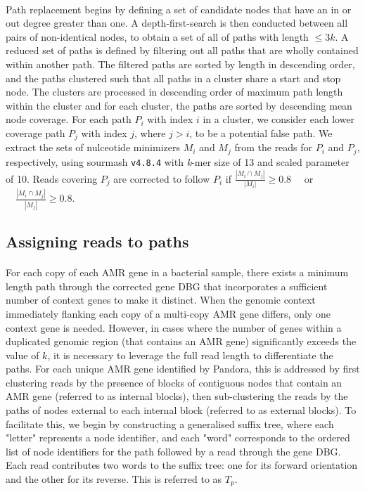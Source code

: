 \paragraph{}
Path replacement begins by defining a set of candidate nodes that have an in or out degree greater than one. A depth-first-search is then conducted between all pairs of non-identical nodes, to obtain a set of all of paths with length $\leq 3k$. A reduced set of paths is defined by filtering out all paths that are wholly contained within another path. The filtered paths are sorted by length in descending order, and the paths clustered such that all paths in a cluster share a start and stop node. The clusters are processed in descending order of maximum path length within the cluster and for each cluster, the paths are sorted by descending mean node coverage. For each path $P_i$ with index $i$ in a cluster, we consider each lower coverage path $P_j$ with index $j$, where $j > i$, to be a potential false path. We extract the sets of nulceotide minimizers $M_i$ and $M_j$ from the reads for $P_i$ and $P_j$, respectively, using sourmash \texttt{v4.8.4} \cite{Pierce2019} with \textit{k}-mer size of 13 and scaled parameter of 10. Reads covering $P_j$ are corrected to follow $P_i$ if $\frac{|M_i \cap M_j|}{|M_i|} \geq 0.8 \quad$ or $\quad \frac{|M_i \cap M_j|}{|M_j|} \geq 0.8$.

\subsection*{Assigning reads to paths}
\paragraph{}

For each copy of each AMR gene in a bacterial sample, there exists a minimum length path through the corrected gene DBG that incorporates a sufficient number of context genes to make it distinct. When the genomic context immediately flanking each copy of a multi-copy AMR gene differs, only one context gene is needed. However, in cases where the number of genes within a duplicated genomic region (that contains an AMR gene) significantly exceeds the value of $k$, it is necessary to leverage the full read length to differentiate the paths. For each unique AMR gene identified by Pandora, this is addressed by first clustering reads by the presence of blocks of contiguous nodes that contain an AMR gene (referred to as internal blocks), then sub-clustering the reads by the paths of nodes external to each internal block (referred to as external blocks). To facilitate this, we begin by constructing a generalised suffix tree, where each "letter" represents a node identifier, and each "word" corresponds to the ordered list of node identifiers for the path followed by a read through the gene DBG. Each read contributes two words to the suffix tree: one for its forward orientation and the other for its reverse. This is referred to as $T_p$.

